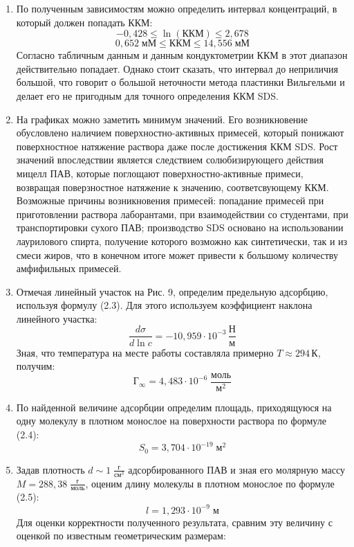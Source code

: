 \documentclass[a4paper, 11pt]{article}%
\begin{document}
\begin{enumerate}
\begin{figure}[!htb]
        \endminipage
    \end{figure}
        \item По полученным зависимостям можно определить интервал концентраций, в который должен попадать ККМ:
        $$-0,428 \leq \ln(\text{ККМ}) \leq 2,678$$
        $$0,652 \; \text{мМ}\leq \text{ККМ} \leq 14,556\; \text{мМ}$$
        Согласно табличным данным и данным кондуктометрии ККМ в этот диапазон действительно попадает. Однако стоит сказать, что интервал до неприличия большой, что говорит о большой неточности метода пластинки Вильгельми и делает его не пригодным для точного определения ККМ SDS.
        \item На графиках можно заметить минимум значений. Его возникновение обусловлено наличием поверхностно-активных примесей, который понижают поверхностное натяжение раствора даже после достижения ККМ SDS. Рост значений впоследствии является следствием солюбизирующего действия мицелл ПАВ, которые поглощают поверхностно-активные примеси, возвращая поверзностное натяжение к значению, соответсвующему ККМ. Возможные причины возникновения примесей: попадание примесей при приготовлении раствора лаборантами, при взаимодействии со студентами, при транспортировки сухого ПАВ; производство SDS основано на использовании лаурилового спирта, получение которого возможно как синтетически, так и из смеси жиров, что в конечном итоге может привести к большому количеству амфифильных примесей.
        \item Отмечая линейный участок на Рис. 9, определим предельную адсорбцию, используя формулу (2.3). Для этого используем коэффициент наклона линейного участка:
        $$\frac{d\sigma}{d\ln c} = -10,959 \cdot 10^{-3} \,  \frac{\text{Н}}{\text{м}}$$
        Зная, что температура на месте работы составляла примерно $T \approx 294 \, \text{К}$, получим:
        $$\text{Г}_{\infty} = 4,483 \cdot 10^{-6} \; \frac{\text{моль}}{\text{м}^2}$$
        \item По найденной величине адсорбции определим площадь, приходящуюся на одну молекулу в плотном монослое на поверхности раствора по формуле (2.4):
        $$S_{0} = 3,704 \cdot 10^{-19} \; \text{м}^2$$
        \item Задав плотность $d \sim 1 \; \frac{\text{г}}{\text{см}^3}$ адсорбированного ПАВ и зная его молярную массу $M = 288,38 \; \frac{\text{г}}{\text{моль}}$,
        оценим длину молекулы в плотном монослое по формуле (2.5):
        $$l = 1,293 \cdot 10^{-9} \; \text{м}$$
        Для оценки корректности полученного результата, сравним эту величину с
        оценкой по известным геометрическим размерам:

\end{enumerate}
\end{document}
